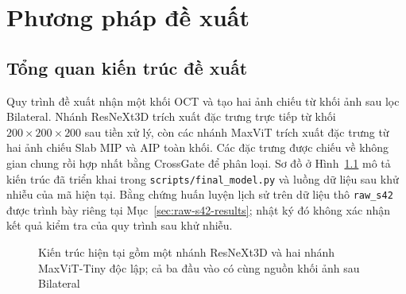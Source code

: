 \documentclass[14pt,a4paper,oneside]{extreport}
\begin{document}
\chapter{Phương pháp đề xuất}
\label{chap:method}
\label{sec:group-a}
\section{Tổng quan kiến trúc đề xuất}
\label{sec:research-workflow}
Quy trình đề xuất nhận một khối OCT và tạo hai ảnh chiếu từ khối ảnh
sau lọc Bilateral. Nhánh ResNeXt3D trích xuất đặc trưng trực tiếp từ
khối $200\times200\times200$ sau tiền xử lý, còn các nhánh MaxViT
trích xuất đặc trưng từ hai ảnh chiếu Slab MIP và AIP toàn khối. Các đặc trưng được chiếu về
không gian chung rồi hợp nhất bằng CrossGate để phân loại.
Sơ đồ ở Hình~\ref{fig:proposed-pipeline} mô tả kiến trúc đã triển khai
trong \texttt{scripts/final\_model.py} và luồng dữ liệu sau khử nhiễu
của mã hiện tại. Bằng chứng huấn luyện lịch sử trên dữ liệu thô
\texttt{raw\_s42} được trình bày riêng tại Mục~\ref{sec:raw-s42-results};
nhật ký đó không xác nhận kết quả kiểm tra của quy trình sau khử nhiễu.

\begin{figure}[htbp]
 \centering
 \caption{Kiến trúc hiện tại gồm một nhánh ResNeXt3D và hai nhánh MaxViT-Tiny độc lập; cả ba đầu vào có cùng nguồn khối ảnh sau Bilateral}
 \label{fig:proposed-pipeline}
\end{figure}
\FloatBarrier
\end{document}
